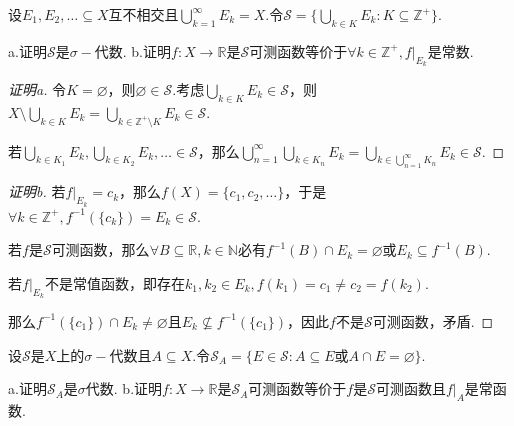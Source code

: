 \begin{problem}[15]\label{2.B.15}
    设\(E_1, E_2, \dots \subseteq X\)互不相交且\(\bigcup_{k=1}^\infty E_k=X\).令\(\mathcal{S}=\{\bigcup_{k \in K} E_k: K \subseteq \mathbb{Z}^+\}\).

    a.证明\(\mathcal{S}\)是\(\sigma-\)代数. \quad b.证明\(f: X \to \mathbb{R}\)是\(\mathcal{S}\)可测函数等价于\(\forall k \in \mathbb{Z}^+, \left.f\right|_{E_k}\)是常数.
\end{problem}

\begin{proof}[证明a]
    令\(K=\varnothing\)，则\(\varnothing \in \mathcal{S}\).考虑\(\bigcup_{k \in K} E_k \in \mathcal{S}\)，则\(X \setminus \bigcup_{k \in K} E_k=\bigcup_{k \in \mathbb{Z}^+ \setminus K} E_k \in \mathcal{S}\).

    若\(\bigcup_{k \in K_1} E_k, \bigcup_{k \in K_2} E_k, \dots \in \mathcal{S}\)，那么\(\bigcup_{n=1}^\infty \bigcup_{k \in K_n} E_k=\bigcup_{k \in \bigcup_{n=1}^\infty K_n} E_k \in \mathcal{S}\).
\end{proof}

\begin{proof}[证明b]
    若\(\left.f\right|_{E_k}=c_k\)，那么\(f(X)=\{c_1, c_2, \dots\}\)，于是\(\forall k \in \mathbb{Z}^+, f^{-1}(\{c_k\})=E_k \in \mathcal{S}\).

    若\(f\)是\(\mathcal{S}\)可测函数，那么\(\forall B \subseteq \mathbb{R}, k \in \mathbb{N}\)必有\(f^{-1}(B) \cap E_k=\varnothing\)或\(E_k \subseteq f^{-1}(B)\).

    若\(\left.f\right|_{E_k}\)不是常值函数，即存在\(k_1, k_2 \in E_k, f(k_1)=c_1 \ne c_2=f(k_2)\).

    那么\(f^{-1}(\{c_1\}) \cap E_k \ne \varnothing\)且\(E_k \nsubseteq f^{-1}(\{c_1\})\)，因此\(f\)不是\(\mathcal{S}\)可测函数，矛盾.
\end{proof}

\begin{problem}[16]\label{2.B.16}
    设\(\mathcal{S}\)是\(X\)上的\(\sigma-\)代数且\(A \subseteq X\).令\(\mathcal{S}_A=\{E \in \mathcal{S}: A \subseteq E \text{或} A \cap E=\varnothing\}\).

    a.证明\(\mathcal{S}_A\)是\(\sigma\)代数. \quad b.证明\(f: X \to \mathbb{R}\)是\(\mathcal{S}_A\)可测函数等价于\(f\)是\(\mathcal{S}\)可测函数且\(\left.f\right|_A\)是常函数.
\end{problem}

